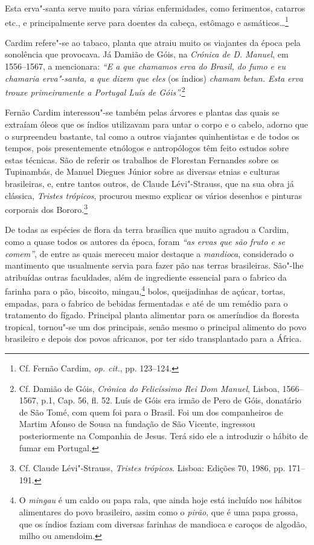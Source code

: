 \begin{hedraquote}
Esta erva"-santa serve muito para várias enfermidades, como
ferimentos, catarros etc., e principalmente serve para doentes da
cabeça, estômago e asmáticos\ldots\footnote{ Cf. Fernão Cardim, \textit{op. cit.}, pp. 123--124.} 
\end{hedraquote}

 Cardim refere"-se ao tabaco, planta que atraiu muito os
viajantes da época pela sonolência que provocava. Já Damião de Góis, na
\textit{Crónica de D. Manuel}, em 1556--1567, a mencionara: \textit{``E
a que chamamos erva do Brasil, do fumo e eu chamaria erva"-santa, a que
dizem que eles} (os índios) \textit{chamam betun. Esta erva
trouxe primeiramente a Portugal Luís de Góis''.}\footnote{ Cf. Damião 
de Góis, \textit{Crônica do Felicíssimo Rei Dom Manuel}, 
Lisboa, 1566--1567, p.1, Cap. 56, fl. 52. Luís de Góis era irmão de
Pero de Góis, donatário de São Tomé, com quem foi para o Brasil. Foi um
dos companheiros de Martim Afonso de Sousa na fundação de São Vicente,
ingressou posteriormente na Companhia de Jesus. Terá sido ele a
introduzir o hábito de fumar em Portugal.}

 Fernão Cardim interessou"-se também pelas árvores
e plantas das quais se extraíam óleos que os índios utilizavam para
untar o corpo e o cabelo, adorno que o surpreendeu bastante, tal como a
outros viajantes quinhentistas e de todos os tempos, pois presentemente
etnólogos e antropólogos têm feito estudos sobre estas técnicas. São de
referir os trabalhos de Florestan Fernandes sobre os Tupinambás, de
Manuel Diegues Júnior sobre as diversas etnias e culturas brasileiras,
e, entre tantos outros, de Claude Lévi"-Strauss, que na sua obra já
clássica, \textit{Tristes trópicos}, procurou mesmo explicar os vários
desenhos e pinturas corporais dos Bororo.\footnote{ Cf. Claude
Lévi"-Strauss, \textit{Tristes trópicos}. Lisboa: Edições
70, 1986, pp. 171--191.}
 
 De todas as espécies de flora da terra brasílica que muito
agradou a Cardim, como a quase todos os autores da época, foram
\textit{``as ervas que são fruto e se comem''}, de entre as quais mereceu
maior destaque a \textit{mandioca}, considerado o mantimento que
usualmente servia para fazer pão nas terras brasileiras. São"-lhe
atribuídas outras faculdades, além de ingrediente essencial para o
fabrico da farinha para o pão, biscoito, mingau,\footnote{ O \textit{mingau} 
é um caldo ou papa rala, que ainda hoje está incluído
nos hábitos alimentares do povo brasileiro, assim como o
\textit{pirão}, que é uma papa grossa, que os índios faziam com
diversas farinhas de mandioca e caroços de algodão, milho ou
amendoim.} bolos, queijadinhas de açúcar, tortas, empadas, para o
fabrico de bebidas fermentadas e até de um remédio para o tratamento
do fígado. Principal planta alimentar para os ameríndios da floresta
tropical, tornou"-se um dos principais, senão mesmo o principal
alimento do povo brasileiro e depois dos povos africanos, por ter sido
transplantado para a África.

